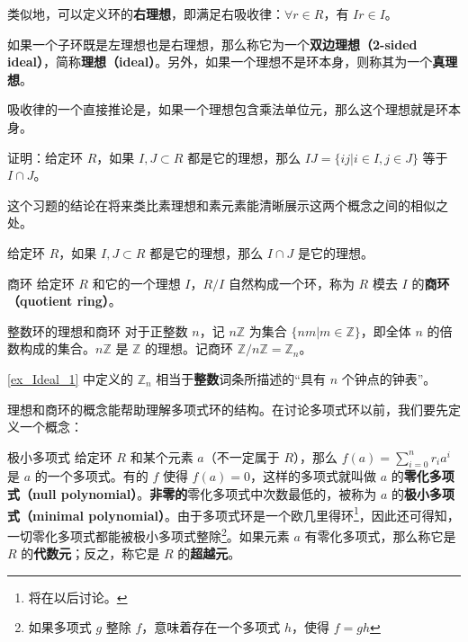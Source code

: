 类似地，可以定义环的\textbf{右理想}，即满足右吸收律：$\forall r\in R$，有 $Ir\in I$。

如果一个子环既是左理想也是右理想，那么称它为一个\textbf{双边理想（2-sided ideal）}，简称\textbf{理想（ideal）}。另外，如果一个理想不是环本身，则称其为一个\textbf{真理想}。

吸收律的一个直接推论是，如果一个理想包含乘法单位元，那么这个理想就是环本身。

\begin{exercise}{}
证明：给定环 $R$，如果 $I, J\subset R$ 都是它的理想，那么 $IJ=\{ij|i\in I, j\in J\}$ 等于 $I\cap J$。
\end{exercise}

这个习题的结论在将来类比素理想和素元素能清晰展示这两个概念之间的相似之处。

\begin{theorem}{}
给定环 $R$，如果 $I, J\subset R$ 都是它的理想，那么 $I\cap J$ 是它的理想。
\end{theorem}


\begin{definition}{商环}
给定环 $R$ 和它的一个理想 $I$，$R/I$ 自然构成一个环，称为 $R$ 模去 $I$ 的\textbf{商环（quotient ring）}。
\end{definition}


\begin{example}{整数环的理想和商环}\label{ex_Ideal_1}
对于正整数 $n$，记 $n\mathbb{Z}$ 为集合 $\{nm|m\in\mathbb{Z}\}$，即全体 $n$ 的倍数构成的集合。$n\mathbb{Z}$ 是 $\mathbb{Z}$ 的理想。记商环 $\mathbb{Z}/n\mathbb{Z}=\mathbb{Z}_n$。
\end{example}

\autoref{ex_Ideal_1} 中定义的 $\mathbb{Z}_n$ 相当于\textbf{整数}词条所描述的“具有 $n$ 个钟点的钟表”。


理想和商环的概念能帮助理解多项式环的结构。在讨论多项式环以前，我们要先定义一个概念：

\begin{definition}{极小多项式}
给定环 $R$ 和某个元素 $a$（不一定属于 $R$），那么 $f(a)=\sum\limits^{n}_{i=0}r_ia^i$ 是 $a$ 的一个多项式。有的 $f$ 使得 $f(a)=0$，这样的多项式就叫做 $a$ 的\textbf{零化多项式（null polynomial）}。\textbf{非零的}零化多项式中次数最低的，被称为 $a$ 的\textbf{极小多项式（minimal polynomial）}。由于多项式环是一个欧几里得环\footnote{将在以后讨论。}，因此还可得知，一切零化多项式都能被极小多项式整除\footnote{如果多项式 $g$ 整除 $f$，意味着存在一个多项式 $h$，使得 $f=gh$}。如果元素 $a$ 有零化多项式，那么称它是 $R$ 的\textbf{代数元}；反之，称它是 $R$ 的\textbf{超越元}。
\end{definition}

